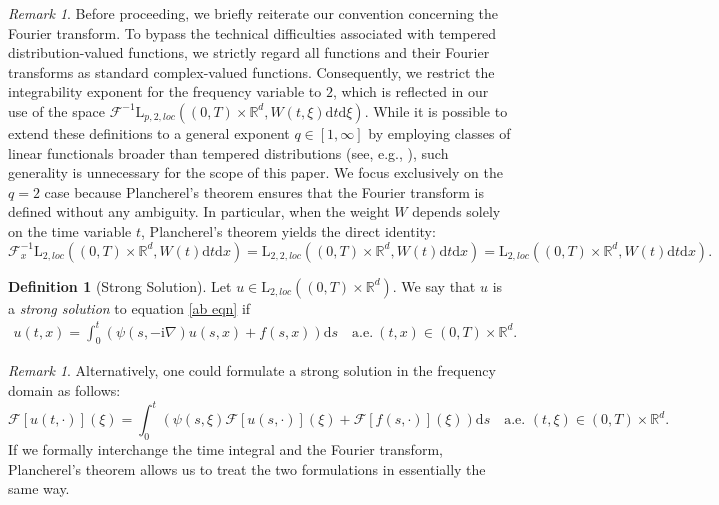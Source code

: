\documentclass[11pt,reqno]{amsart}
\theoremstyle{definition}
\newtheorem{defn}[thm]{Definition}
\theoremstyle{remark}
\newtheorem{rem}[thm]{Remark}
\newcommand\bR{\mathbb{R}}
\numberwithin{equation}{section}
\begin{document}
\begin{rem}
Before proceeding, we briefly reiterate our convention concerning the Fourier transform. 
To bypass the technical difficulties associated with tempered distribution-valued functions, we strictly regard all functions and their Fourier transforms as standard complex-valued functions. 
Consequently, we restrict the integrability exponent for the frequency variable to $2$, which is reflected in our use of the space $\mathcal{F}^{-1}\mathrm{L}_{p,2,loc}\left( (0,T) \times \mathbb{R}^d, W(t,\xi)\mathrm{d}t \mathrm{d}\xi \right)$.
While it is possible to extend these definitions to a general exponent $q \in [1,\infty]$ by employing classes of linear functionals broader than tempered distributions (see, e.g., \cite{CK 2024, CK 2024-2}), such generality is unnecessary for the scope of this paper. 
We focus exclusively on the $q=2$ case because Plancherel's theorem ensures that the Fourier transform is defined without any ambiguity. 
In particular, when the weight $W$ depends solely on the time variable $t$, Plancherel's theorem yields the direct identity:
$$
\mathcal{F}_x^{-1}\mathrm{L}_{2,loc}\left( (0,T) \times \mathbb{R}^d, W(t)\mathrm{d}t \mathrm{d}x \right) 
=\mathrm{L}_{2,2,loc}\left( (0,T) \times \mathbb{R}^d, W(t)\mathrm{d}t \mathrm{d}x \right)
=\mathrm{L}_{2,loc}\left( (0,T) \times \mathbb{R}^d, W(t)\mathrm{d}t \mathrm{d}x \right).
$$
\end{rem}


\begin{defn}[Strong Solution]
							\label{strong solution}
Let $u \in \mathrm{L}_{2,loc}\left((0,T) \times \bR^d  \right)$.
We say that $u$ is a \emph{strong solution} to equation \eqref{ab eqn} if
\begin{align}
										\label{20230213 30}
u(t,x) = \int_0^t \left(\psi(s,-\mathrm{i}\nabla)u(s,x)+f(s,x)   \right) \mathrm{d}s \quad \text{a.e.}~ (t,x) \in (0,T) \times \bR^d.
\end{align}
\end{defn}

\begin{rem}
Alternatively, one could formulate a strong solution in the frequency domain as follows:
$$
\mathcal{F}[u(t,\cdot)](\xi) = \int_0^t \left(\psi(s,\xi)\mathcal{F}[u(s,\cdot)](\xi)+\mathcal{F}[f(s,\cdot)](\xi) \right) \mathrm{d}s \quad \text{a.e. } (t,\xi) \in (0,T) \times \mathbb{R}^d.
$$
If we formally interchange the time integral and the Fourier transform, Plancherel's theorem allows us to treat the two formulations in essentially the same way. 
\end{rem}
\end{document}
